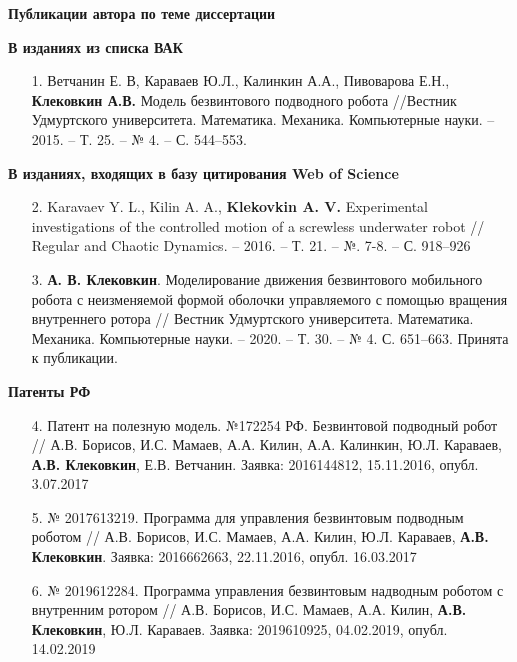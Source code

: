 {
\vspace{2mm}

{\large  \textbf{Публикации автора по теме диссертации}}

\textbf{В изданиях из списка ВАК}
\begin{enumerate}	
	\item[1.] Ветчанин Е. В, Караваев Ю.Л., Калинкин А.А., Пивоварова Е.Н., \textbf{Клековкин А.В.} Модель безвинтового подводного робота //Вестник Удмуртского университета. Математика. Механика. Компьютерные науки. -- 2015. -- Т. 25. -- № 4. -- С. 544--553.
		
\end{enumerate}

\textbf{В изданиях, входящих в базу цитирования Web of Science}
\begin{enumerate}	
	\item[2.] Karavaev Y. L., Kilin A. A., \textbf{Klekovkin A. V.} Experimental investigations of the controlled motion of a screwless underwater robot // Regular and Chaotic Dynamics. -- 2016. -- Т. 21. -- №. 7-8. -- С. 918--926
	
	\item[3.] \textbf{А. В. Клековкин}. Моделирование движения безвинтового мобильного робота с неизменяемой формой оболочки управляемого с помощью вращения внутреннего ротора // Вестник Удмуртского университета. Математика. Механика. Компьютерные науки. -- 2020. -- Т. 30. -- № 4. С. 651--663. Принята к публикации.
\end{enumerate}

\textbf{Патенты РФ}
	\begin{enumerate}		
		\item[4.] Патент на полезную модель. №172254 РФ. Безвинтовой подводный робот //  А.В. Борисов, И.С. Мамаев, А.А. Килин, А.А. Калинкин, Ю.Л. Караваев, \textbf{А.В. Клековкин}, Е.В. Ветчанин. Заявка: 2016144812, 15.11.2016, опубл. 3.07.2017
		
		\item[5.] № 2017613219. Программа для управления безвинтовым подводным роботом // А.В. Борисов, И.С. Мамаев, А.А. Килин, Ю.Л. Караваев, \textbf{А.В. Клековкин}. Заявка: 2016662663, 22.11.2016, опубл. 16.03.2017
		
		\item[6.] № 2019612284. Программа управления безвинтовым надводным роботом с внутренним ротором // А.В. Борисов, И.С. Мамаев, А.А. Килин, \textbf{А.В. Клековкин}, Ю.Л. Караваев. Заявка: 2019610925, 04.02.2019, опубл. 14.02.2019
	\end{enumerate}
}

